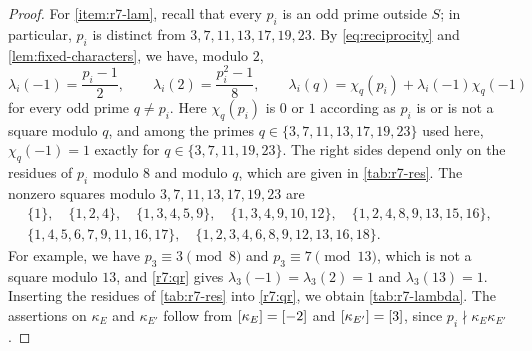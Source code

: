 \begin{proof}
For \ref{item:r7-lam}, recall that every $p_i$ is an odd prime outside $S$;
in particular, $p_i$ is distinct from $3,7,11,13,17,19,23$. By \eqref{eq:reciprocity} and
\cref{lem:fixed-characters}, we have, modulo $2$,
\begin{equation}\label{r7:qr}
 \lambda_i(-1)=\frac{p_i-1}2,\qquad \lambda_i(2)=\frac{p_i^2-1}8,\qquad
 \lambda_i(q)=\chi_q(p_i)+\lambda_i(-1)\chi_q(-1)
\end{equation}
for every odd prime $q\ne p_i$. Here $\chi_q(p_i)$ is $0$ or $1$
according as $p_i$ is or is not a square modulo $q$, and among the primes
$q\in\{3,7,11,13,17,19,23\}$ used here, $\chi_q(-1)=1$ exactly for
$q\in\{3,7,11,19,23\}$. The right sides depend only on the residues of $p_i$
modulo $8$ and modulo $q$, which are given in \cref{tab:r7-res}. The nonzero
squares modulo $3,7,11,13,17,19,23$ are
\[
\begin{gathered}
 \{1\},\quad \{1,2,4\},\quad \{1,3,4,5,9\},\quad \{1,3,4,9,10,12\},\quad
 \{1,2,4,8,9,13,15,16\},\\
 \{1,4,5,6,7,9,11,16,17\},\quad \{1,2,3,4,6,8,9,12,13,16,18\}.
\end{gathered}
\]
For example, we have $p_3\equiv3\pmod8$ and $p_3\equiv7\pmod{13}$, which is
not a square modulo $13$, and \eqref{r7:qr} gives
$\lambda_3(-1)=\lambda_3(2)=1$ and $\lambda_3(13)=1$. Inserting the residues of \cref{tab:r7-res} into
\eqref{r7:qr}, we obtain \cref{tab:r7-lambda}. The assertions on
$\kappa_E$ and $\kappa_{E'}$ follow from $[\kappa_E]=[-2]$ and
$[\kappa_{E'}]=[3]$, since $p_i\nmid\kappa_E\kappa_{E'}$.


\end{proof}
